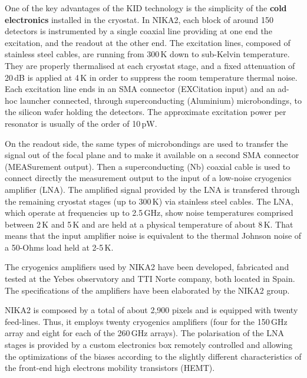 \documentclass[]{aa} %
\begin{document}
One of the key advantages of the KID technology is the simplicity of the {\bf{cold electronics}} installed in the cryostat.
In NIKA2, each block of around 150 detectors is instrumented by a single coaxial line providing at one end the excitation, and the readout at the other end. The excitation lines, composed of stainless steel cables, are running from 300\,K down to sub-Kelvin temperature. They are properly thermalised at each cryostat stage, and a fixed attenuation of 20\,dB is applied at 4\,K in order to suppress the room temperature thermal noise. Each excitation line ends in an SMA connector (EXCitation input) and an ad-hoc launcher connected, through superconducting (Aluminium) microbondings, to the silicon wafer holding the detectors. The approximate excitation power per resonator is usually of the order of 10\,pW.

On the readout side, the same types of microbondings are used to transfer the signal out of the focal plane and to make it available on a second SMA connector (MEASurement output). Then a superconducting (Nb) coaxial cable is used to connect directly the measurement output to the input of a low-noise cryogenics amplifier (LNA). The amplified signal provided by the LNA is transfered through the remaining cryostat stages (up to 300\,K) via stainless steel cables. 
The LNA, which operate at frequencies up to 2.5\,GHz, show noise temperatures comprised between 2\,K and 5\,K and are held at a physical temperature of about 8\,K. That means that the input amplifier noise is equivalent to the thermal Johnson noise of a 50-Ohms load held at 2-5\,K.

The cryogenics amplifiers used by NIKA2 have been developed, fabricated and tested at the Yebes observatory and TTI Norte company, both located in Spain. The specifications of the amplifiers have been elaborated by the NIKA2 group.

NIKA2 is composed by a total of about 2,900 pixels and is equipped with twenty feed-lines. Thus, it employs twenty cryogenics amplifiers (four for the 150\,GHz array and eight for each of the 260\,GHz arrays). The polarisation of the LNA stages is provided by a custom electronics box remotely controlled and allowing the optimizations of the biases according to the slightly different characteristics of the front-end high electrons mobility transistors (HEMT). 
\end{document}
